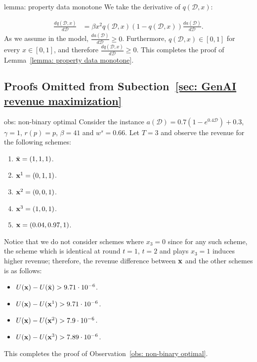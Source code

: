 \begin{proofof}{lemma: property data monotone}
We take the derivative of $q(\mathcal{D}, x)$:

\begin{align*}
\frac{dq(\mathcal{D}, x)}{d\mathcal{D}} &= \beta x^2 q(\mathcal{D}, x)(1-q(\mathcal{D}, x)) \frac{da(\mathcal{D})}{d\mathcal{D}}.
\end{align*}
As we assume in the model, $\frac{da(\mathcal{D})}{d\mathcal{D}} \geq 0$. Furthermore, $q(\mathcal{D}, x) \in [0, 1]$ for every $x \in [0, 1]$, and therefore $\frac{dq(\mathcal{D}, x)}{d\mathcal{D}} \geq 0$. This completes the proof of Lemma~\ref{lemma: property data monotone}.
\end{proofof}





















\subsection{Proofs Omitted from Subection~\ref{sec: GenAI revenue maximization}} \label{appn: revenue maximization}

\begin{proofof}{obs: non-binary optimal}
Consider the instance $a(\mathcal{D}) = 0.7(1-e^{0.4 \mathcal{D}}) + 0.3$, $\gamma = 1$, $r(p) = p$, $\beta = 41$ and $w^s = 0.66$. Let $T = 3$ and observe the revenue for the following schemes:
\begin{enumerate}
    \item $\Bar{{\bf{x}}} = (1,1,1)$.
    \item ${\bf{x}}^1 = (0, 1, 1)$.
    \item ${\bf{x}}^2 = (0, 0, 1)$.
    \item ${\bf{x}}^3 = (1, 0, 1)$.
    \item ${\bf{x}} = (0.04, 0.97, 1)$.
\end{enumerate}
Notice that we do not consider schemes where $x_3 = 0$ since for any such scheme, the scheme which is identical at round $t = 1$, $t = 2$ and plays $x_3 = 1$ induces higher revenue; therefore, the revenue difference between ${\bf{x}}$ and the other schemes is as follows:
\begin{itemize}
    \item $U({\bf{x}}) - U(\Bar{{\bf{x}}}) > 9.71 \cdot 10^{-6}$.
    \item $U({\bf{x}}) - U({\bf{x}}^1) > 9.71 \cdot 10^{-6}$.
    \item $U({\bf{x}}) - U({\bf{x}}^2) > 7.9 \cdot 10^{-6}$.
    \item $U({\bf{x}}) - U({\bf{x}}^3) > 7.89 \cdot 10^{-6}$.
\end{itemize}

This completes the proof of Observation~\ref{obs: non-binary optimal}.
\end{proofof}


